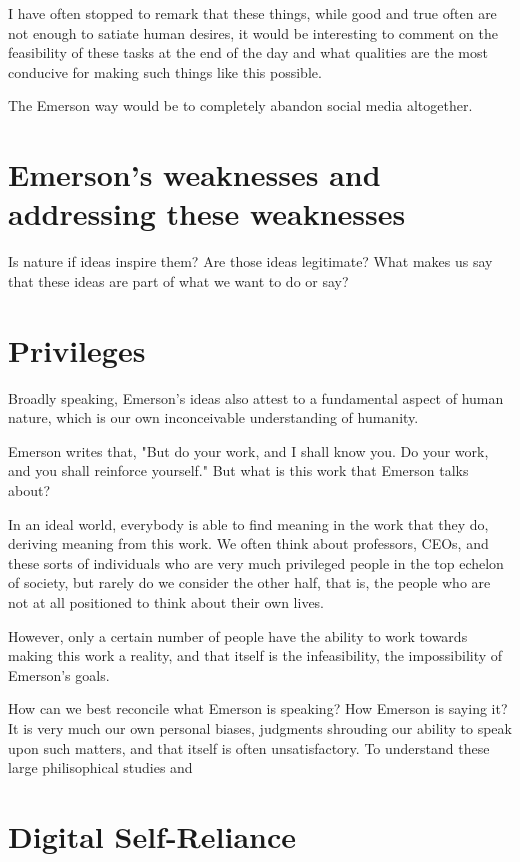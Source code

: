 \documentclass[12pt,letterpaper]{article}
\begin{document}
I have often stopped to remark that these things, while good
and true often are not enough to satiate human desires,  it
would be interesting to comment on the feasibility of these
tasks at the end of the day and what qualities are the most
conducive for making such things like this possible.

The Emerson way would be to completely abandon social media
altogether.

\section{Emerson's weaknesses and addressing these weaknesses}

Is nature if ideas inspire them?  Are those ideas legitimate?  What makes us say that these ideas are part of what we want to do or say?


\section{Privileges}
Broadly speaking, Emerson's ideas also attest to a
fundamental aspect of human nature, which is our own
inconceivable understanding of humanity.

Emerson writes that, "But do your work, and I shall know you. Do your work, and you shall reinforce yourself."  But what is this work that Emerson talks about?
  
In an ideal world, everybody is able to find meaning in the
work that they do, deriving meaning from this work.
We often think about professors, CEOs, and these sorts of
individuals who are very much privileged people in the top
echelon of society, but rarely do we consider the other
half, that is, the people who are not at all positioned to think about their own lives.

However, only a certain number of people have the ability to
work towards making this work a reality, and that itself is
the infeasibility, the impossibility of Emerson's goals.

How can we best reconcile what Emerson is speaking?  How
Emerson is saying it?  It is very much our own personal
biases, judgments shrouding our ability to speak upon such
matters, and that itself is often unsatisfactory.  To
understand these large philisophical studies and 

\section{Digital Self-Reliance}
\end{document}
